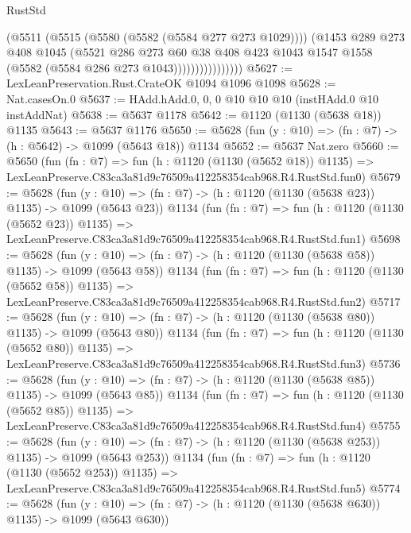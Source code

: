 \begin{lexlean}{RustStd}
\begin{coremodule}
                          (@5511
                            (@5515 (@5580 (@5582 (@5584 @277 @273 @1029))))
                            (@1453
                              @289
                              @273
                              @408
                              @1045
                              (@5521
                                @286
                                @273
                                @60
                                @38
                                @408
                                @423
                                @1043
                                @1547
                                @1558
                                (@5582 (@5584 @286 @273 @1043))))))))))))))))
@5627 := LexLeanPreservation.Rust.CrateOK @1094 @1096 @1098
@5628 := Nat.casesOn.{0}
@5637 := HAdd.hAdd.{0, 0, 0} @10 @10 @10 (instHAdd.{0} @10 instAddNat)
@5638 := @5637 @1178
@5642 := @1120 (@1130 (@5638 @18)) @1135
@5643 := @5637 @1176
@5650 := @5628 (fun (y : @10) => (fn : @7) -> (h : @5642) -> @1099 (@5643 @18)) @1134
@5652 := @5637 Nat.zero
@5660 := @5650
    (fun (fn : @7) =>
    fun (h : @1120 (@1130 (@5652 @18)) @1135) =>
    LexLeanPreserve.C83ca3a81d9c76509a412258354cab968.R4.RustStd.fun0)
@5679 := @5628
    (fun (y : @10) => (fn : @7) -> (h : @1120 (@1130 (@5638 @23)) @1135) -> @1099 (@5643 @23))
    @1134
    (fun (fn : @7) =>
    fun (h : @1120 (@1130 (@5652 @23)) @1135) =>
    LexLeanPreserve.C83ca3a81d9c76509a412258354cab968.R4.RustStd.fun1)
@5698 := @5628
    (fun (y : @10) => (fn : @7) -> (h : @1120 (@1130 (@5638 @58)) @1135) -> @1099 (@5643 @58))
    @1134
    (fun (fn : @7) =>
    fun (h : @1120 (@1130 (@5652 @58)) @1135) =>
    LexLeanPreserve.C83ca3a81d9c76509a412258354cab968.R4.RustStd.fun2)
@5717 := @5628
    (fun (y : @10) => (fn : @7) -> (h : @1120 (@1130 (@5638 @80)) @1135) -> @1099 (@5643 @80))
    @1134
    (fun (fn : @7) =>
    fun (h : @1120 (@1130 (@5652 @80)) @1135) =>
    LexLeanPreserve.C83ca3a81d9c76509a412258354cab968.R4.RustStd.fun3)
@5736 := @5628
    (fun (y : @10) => (fn : @7) -> (h : @1120 (@1130 (@5638 @85)) @1135) -> @1099 (@5643 @85))
    @1134
    (fun (fn : @7) =>
    fun (h : @1120 (@1130 (@5652 @85)) @1135) =>
    LexLeanPreserve.C83ca3a81d9c76509a412258354cab968.R4.RustStd.fun4)
@5755 := @5628
    (fun (y : @10) => (fn : @7) -> (h : @1120 (@1130 (@5638 @253)) @1135) -> @1099 (@5643 @253))
    @1134
    (fun (fn : @7) =>
    fun (h : @1120 (@1130 (@5652 @253)) @1135) =>
    LexLeanPreserve.C83ca3a81d9c76509a412258354cab968.R4.RustStd.fun5)
@5774 := @5628
    (fun (y : @10) => (fn : @7) -> (h : @1120 (@1130 (@5638 @630)) @1135) -> @1099 (@5643 @630))

\end{coremodule}
\end{lexlean}
